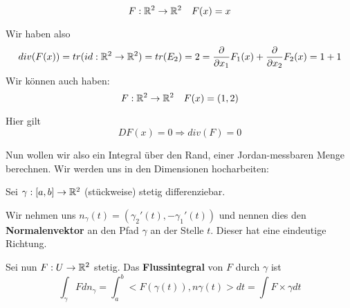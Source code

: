 \documentclass[main.tex]{subfiles}
\begin{document}
\begin{Beispiel}
  $$F: \mathbb{R}^2 \to \mathbb{R}^2 \quad F(x) = x$$
  \begin{center}
  \end{center}
  Wir haben also
  $$div(F(x)) = tr(id:\mathbb{R}^2 \to \mathbb{R}^2) = tr(E_2) = 2 = \dfrac{\partial}{\partial x_1}F_1(x) + \dfrac{\partial}{\partial x_2}F_2(x) = 1 + 1$$
  Wir können auch haben:
  $$F: \mathbb{R}^2 \to \mathbb{R}^2 \quad F(x) = (1,2)$$
  \begin{center}
  \end{center}
  Hier gilt
  $$DF(x) = 0 \Rightarrow div(F) = 0$$
\end{Beispiel}

Nun wollen wir also ein Integral über den Rand, einer Jordan-messbaren Menge berechnen. Wir werden uns in den Dimensionen hocharbeiten:

\begin{Definition}[Flussintegral]
  Sei $\gamma: [a,b] \to \mathbb{R}^2$ (stückweise) stetig differenziebar.

  Wir nehmen uns $n_\gamma(t) = (\gamma_2'(t),-\gamma_1'(t))$ und nennen dies den \textbf{Normalenvektor} an den Pfad $\gamma$ an der Stelle $t$. Dieser hat eine eindeutige Richtung.

  Sei nun $F : U \to \mathbb{R}^2$ stetig. Das \textbf{Flussintegral} von $F$ durch $\gamma$ ist
  $$\int_\gamma F dn_\gamma = \int_a^b <F(\gamma(t)),n\gamma(t)> dt = \int F \times \gamma dt$$
\end{Definition}
\end{document}
